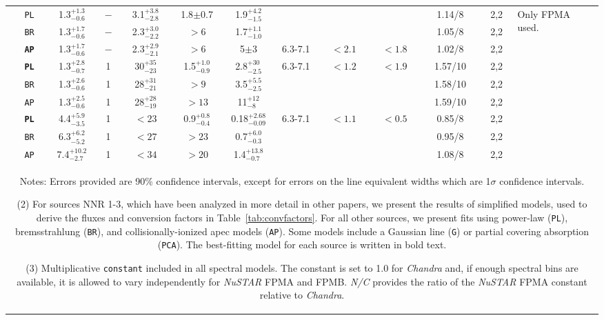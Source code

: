 \documentclass[iop,revtex4]{emulateapj}
\newcommand\T{\rule{0pt}{2.6ex}}       %
\newcommand\M{\rule{0pt}{2.3ex}}
\newcommand\U{\rule{0pt}{3.2ex}}       %
\newcommand\D{\rule[-2.4ex]{0pt}{0pt}} %
\begin{document}
\begin{landscape}
\begin{longtable}{cp{0.6in}ccccccccccp{1.7in}}
\U\multirow{3}{*}{25}&\texttt{PL}&1.3$^{+1.3}_{-0.6}$&$-$&3.1$^{+3.8}_{-2.8}$&1.8$\pm$0.7&1.9$^{+4.2}_{-1.5}$& &&&1.14/8&2,2&\multirow{3}{1.7in}{Only FPMA used.}\\
\M&\texttt{BR}&1.3$^{+1.7}_{-0.6}$&$-$&2.3$^{+3.0}_{-2.2}$&$>6$&1.7$^{+1.1}_{-1.0}$&&&&1.05/8&2,2&\\
\M\D&\textbf{\texttt{AP}}&1.3$^{+1.7}_{-0.6}$&$-$&2.3$^{+2.9}_{-2.1}$&$>6$&5$\pm$3&6.3-7.1&$<2.1$&$<1.8$&1.02/8&2,2&\\
\cline{13-13}

\U\multirow{3}{*}{26}&\textbf{\texttt{PL}}&1.3$^{+2.8}_{-0.7}$&1&30$^{+35}_{-23}$&1.5$^{+1.0}_{-0.9}$&2.8$^{+30}_{-2.5}$ &6.3-7.1&$<1.2$&$<1.9$&1.57/10&2,2&\\
\M&\texttt{BR}&1.3$^{+2.6}_{-0.6}$&1&28$^{+31}_{-21}$&$>9$&3.5$^{+5.5}_{-2.5}$&&&&1.58/10&2,2&\\
\M\D&\texttt{AP}&1.3$^{+2.5}_{-0.6}$&1&28$^{+28}_{-19}$&$>13$&11$^{+12}_{-8}$&&&&1.59/10&2,2&\\
\cline{13-13}

\U\multirow{3}{*}{27}&\textbf{\texttt{PL}}&4.4$^{+5.9}_{-3.5}$&1&$<23$&0.9$^{+0.8}_{-0.4}$&0.18$^{+2.68}_{-0.09}$ &6.3-7.1&$<1.1$&$<0.5$&0.85/8&2,2&\\
\M&\texttt{BR}&6.3$^{+6.2}_{-5.2}$&1&$<27$&$>23$&0.7$^{+6.0}_{-0.3}$&&&&0.95/8&2,2&\\
\M\D&\texttt{AP}&7.4$^{+10.2}_{-2.7}$&1&$<34$&$>20$&1.4$^{+13.8}_{-0.7}$&&&&1.08/8&2,2&\\

\hline \hline
\multicolumn{13}{p{8.9in}}{\T Notes: Errors provided are 90\% confidence intervals, except for errors on the line equivalent widths which are 1$\sigma$ confidence intervals.

(2) For sources NNR 1-3, which have been analyzed in more detail in other papers, we present the results of simplified models, used to derive the fluxes and conversion factors in Table~\ref{tab:convfactors}.  For all other sources, we present fits using power-law (\texttt{PL}), bremsstrahlung (\texttt{BR}), and collisionally-ionized apec models (\texttt{AP}).  Some models include a Gaussian line (\texttt{G}) or partial covering absorption (\texttt{PCA}). The best-fitting model for each source is written in bold text.

(3) Multiplicative \texttt{constant} included in all spectral models.  The constant is set to 1.0 for \textit{Chandra} and, if enough spectral bins are available, it is allowed to vary independently for \textit{NuSTAR} FPMA and FPMB.  \textit{N/C} provides the ratio of the \textit{NuSTAR} FPMA constant relative to \textit{Chandra}. 
 
}
\end{longtable}
\end{landscape}
\end{document}
